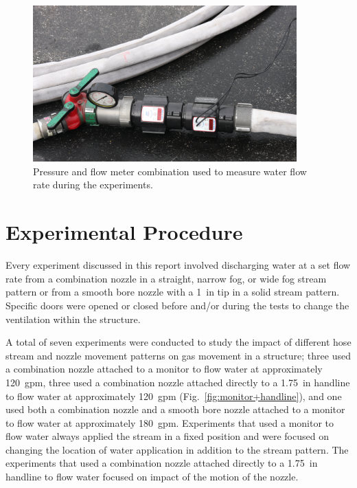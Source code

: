 \documentclass[12pt,oneside]{book}
\begin{document}
\begin{figure}[!ht]
	\includegraphics[width=4in]{../Figures/Pictures/flow_meter}
	\caption[Flow meter used to measure flow rate during experiments.]{Pressure and flow meter combination used to measure water flow rate during the experiments.}
	\label{fig:flow_meter}
\end{figure}
\FloatBarrier

\section{Experimental Procedure}
\label{sec:exp_procedure}
Every experiment discussed in this report involved discharging water at a set flow rate from a combination nozzle in a straight, narrow fog, or wide fog stream pattern or from a smooth bore nozzle with a 1~in tip in a solid stream pattern. Specific doors were opened or closed before and/or during the tests to change the ventilation within the structure. 

A total of seven experiments were conducted to study the impact of different hose stream and nozzle movement patterns on gas movement in a structure; three used a combination nozzle attached to a monitor to flow water at approximately 120~gpm, three used a combination nozzle attached directly to a 1.75~in handline to flow water at approximately 120~gpm (Fig.~\ref{fig:monitor+handline}), and one used both a combination nozzle and a smooth bore nozzle attached to a monitor to flow water at approximately 180~gpm. Experiments that used a monitor to flow water always applied the stream in a fixed position and were focused on changing the location of water application in addition to the stream pattern. The experiments that used a combination nozzle attached directly to a 1.75~in handline to flow water focused on impact of the motion of the nozzle.
\end{document}
